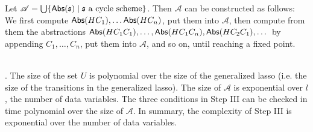 Let $\mathscr{A}=\bigcup \{\mathsf{Abs}({\mathfrak{s} }) \mid {\mathfrak{s} } \mbox{ a cycle scheme}\}$. Then $\mathscr{A}$ can be constructed as follows: We first compute $\mathsf{Abs}(HC_1), \ldots \mathsf{Abs}(HC_n)$, put them into $\mathscr{A}$, then compute from them the abstractions $\mathsf{Abs}(HC_1C_1),\dots, \mathsf{Abs}(HC_1C_n), \mathsf{Abs}(HC_2C_1), \dots$ by appending $C_1,\dots,C_n$, put them into $\mathscr{A}$, and so on, until reaching a fixed point.

\bigskip
{}\medskip\\

. The size of the set $U$ is polynomial over the size of the generalized lasso (i.e. the size of the transitions in the generalized lasso). The size of $\mathscr{A}$ is exponential over $l$, the number of data variables. The three conditions in Step III can be checked in time polynomial over the size of $\mathscr{A}$. In summary, the complexity of Step III is exponential over the number of data variables.

